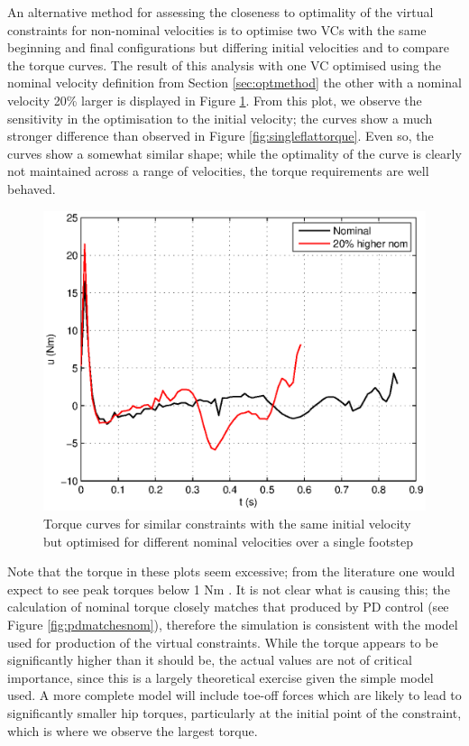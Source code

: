 An alternative method for assessing the closeness to optimality of the virtual constraints for non-nominal velocities is to optimise two VCs with the same beginning and final configurations but differing initial velocities and to compare the torque curves. The result of this analysis with one VC optimised using the nominal velocity definition from Section \ref{sec:optmethod} the other with a nominal velocity 20\% larger is displayed in Figure \ref{fig:twonomvels}. From this plot, we observe the sensitivity in the optimisation to the initial velocity; the curves show a much stronger difference than observed in Figure \ref{fig:singleflattorque}. Even so, the curves show a somewhat similar shape; while the optimality of the curve is clearly not maintained across a range of velocities, the torque requirements are well behaved.

\begin{figure}
\centering
\includegraphics[width=0.8\linewidth]{7Results/twonomvels}
\caption[Torque curves with differing nominal velocities]{Torque curves for similar constraints with the same initial velocity but optimised for different nominal velocities over a single footstep}
\label{fig:twonomvels}
\end{figure}

Note that the torque in these plots seem excessive; from the literature one would expect to see peak torques below 1 Nm \cite{westervelt2007feedback, collins2005efficient}. It is not clear what is causing this; the calculation of nominal torque closely matches that produced by PD control (see Figure \ref{fig:pdmatchesnom}), therefore the simulation is consistent with the model used for production of the virtual constraints. While the torque appears to be significantly higher than it should be, the actual values are not of critical importance, since this is a largely theoretical exercise given the simple model used. A more complete model will include toe-off forces which are likely to lead to significantly smaller hip torques, particularly at the initial point of the constraint, which is where we observe the largest torque.

